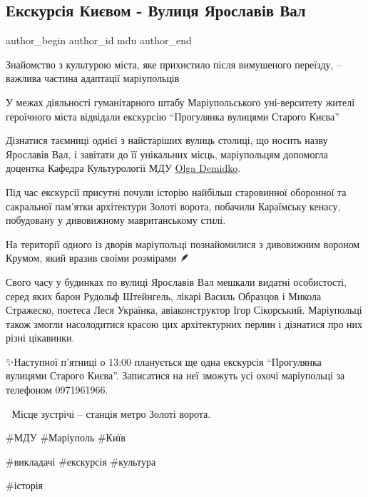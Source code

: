  
 
 
 
 

\subsection{Екскурсія Києвом - Вулиця Ярославів Вал}
\label{sec:28_04_2023.fb.mdu.1.ekskursia_kyiv_vulycja_jaroslaviv_val}

\ifcmt
 author_begin
   author_id mdu
 author_end
\fi

Знайомство з культурою міста, яке прихистило після вимушеного переїзду, –
важлива частина адаптації маріупольців 🙌 

У межах діяльності гуманітарного штабу Маріупольського уні\hyp{}верситету жителі
героїчного міста відвідали екскурсію \enquote{Прогулянка вулицями Старого Києва}🕍

Дізнатися таємниці однієї з найстаріших вулиць столиці, що носить назву
Ярославів Вал, і завітати до її унікальних місць, маріупольцям допомогла
доцентка Кафедра Культурології МДУ \href{\urlDemidkoIA}{Olga Demidko}.

Під час екскурсії присутні почули історію найбільш старовинної оборонної та
сакральної пам'ятки архітектури Золоті ворота, побачили Караїмську кенасу,
побудовану у дивовижному мавританському стилі. 

На території одного із дворів маріупольці познайомилися з дивовижним вороном
Крумом, який вразив своїми розмірами 🪶

Свого часу у будинках по вулиці Ярославів Вал мешкали видатні особистості,
серед яких барон Рудольф Штейнгель, лікарі Василь Образцов і Микола Стражеско,
поетеса Леся Українка, авіаконструктор Ігор Сікорський. Маріупольці також
змогли насолодитися красою цих архітектурних перлин і дізнатися про них різні
цікавинки.

✨Наступної п'ятниці о 13:00 планується ще одна екскурсія \enquote{Прогулянка вулицями
Старого Києва}. Записатися на неї зможуть усі охочі маріупольці за телефоном
0971961966.

📍 Місце зустрічі – станція метро Золоті ворота.

\#МДУ \#Маріуполь \#Київ 

\#викладачі \#екскурсія \#культура 

\#історія
